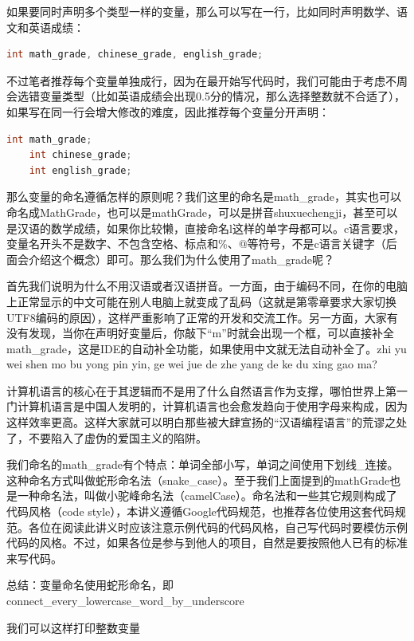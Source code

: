 如果要同时声明多个类型一样的变量，那么可以写在一行，比如同时声明数学、语文和英语成绩：

\begin{lstlisting}[language=C]
    int math_grade, chinese_grade, english_grade;
\end{lstlisting}

不过笔者推荐每个变量单独成行，因为在最开始写代码时，我们可能由于考虑不周会选错变量类型（比如英语成绩会出现0.5分的情况，那么选择整数就不合适了），如果写在同一行会增大修改的难度，因此推荐每个变量分开声明：

\begin{lstlisting}[language=C]
    int math_grade;
    int chinese_grade;
    int english_grade;
\end{lstlisting}

那么变量的命名遵循怎样的原则呢？我们这里的命名是math\_grade，其实也可以命名成MathGrade，也可以是mathGrade，可以是拼音shuxuechengji，甚至可以是汉语的数学成绩，如果你比较懒，直接命名l这样的单字母都可以。c语言要求，变量名开头不是数字、不包含空格、标点和\%、@等符号，不是c语言关键字（后面会介绍这个概念）即可。那么我们为什么使用了math\_grade呢？

首先我们说明为什么不用汉语或者汉语拼音。一方面，由于编码不同，在你的电脑上正常显示的中文可能在别人电脑上就变成了乱码（这就是第零章要求大家切换UTF8编码的原因），这样严重影响了正常的开发和交流工作。另一方面，大家有没有发现，当你在声明好变量后，你敲下“m”时就会出现一个框，可以直接补全math\_grade，这是IDE的自动补全功能，如果使用中文就无法自动补全了。zhi yu wei shen mo bu yong pin yin, ge wei jue de zhe yang de ke du xing gao ma?

计算机语言的核心在于其逻辑而不是用了什么自然语言作为支撑，哪怕世界上第一门计算机语言是中国人发明的，计算机语言也会愈发趋向于使用字母来构成，因为这样效率更高。这样大家就可以明白那些被大肆宣扬的“汉语编程语言”的荒谬之处了，不要陷入了虚伪的爱国主义的陷阱。

我们命名的math\_grade有个特点：单词全部小写，单词之间使用下划线\_连接。这种命名方式叫做蛇形命名法（snake\_case）。至于我们上面提到的mathGrade也是一种命名法，叫做小驼峰命名法（camelCase）。命名法和一些其它规则构成了代码风格（code style），本讲义遵循Google代码规范，也推荐各位使用这套代码规范。各位在阅读此讲义时应该注意示例代码的代码风格，自己写代码时要模仿示例代码的风格。不过，如果各位是参与到他人的项目，自然是要按照他人已有的标准来写代码。

总结：变量命名使用蛇形命名，即connect\_every\_lowercase\_word\_by\_underscore

我们可以这样打印整数变量

